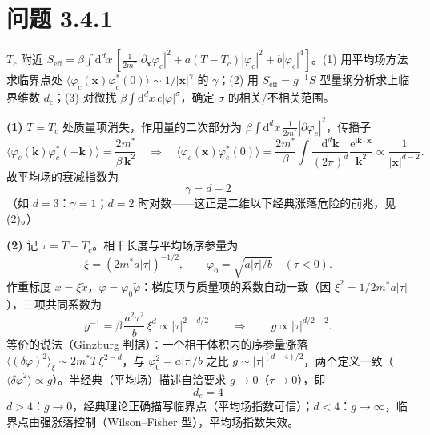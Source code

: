 \section*{问题 3.4.1}
\begin{problem}
$T_c$ 附近 $S_{\mathrm{eff}}=\beta\int\mathrm{d}^dx\,[\frac{1}{2m^{*}}|\partial_{\pmb{x}}\varphi_c|^{2}+a(T-T_c)|\varphi_c|^{2}+b|\varphi_c|^{4}]$。(1) 用平均场方法求临界点处 $\langle\varphi_c(\pmb{x})\varphi_c^{*}(0)\rangle\sim1/|\pmb{x}|^{\gamma}$ 的 $\gamma$；(2) 用 $S_{\mathrm{eff}}=g^{-1}\tilde S$ 型量纲分析求上临界维数 $d_c$；(3) 对微扰 $\beta\int\mathrm{d}^dx\,c|\varphi|^{\sigma}$，确定 $\sigma$ 的相关/不相关范围。
\end{problem}
\solution

\textbf{(1)} $T=T_c$ 处质量项消失，作用量的二次部分为 $\beta\int\mathrm{d}^dx\,\frac{1}{2m^{*}}|\partial\varphi_c|^{2}$，传播子
\begin{equation*}
\langle\varphi_c(\pmb{k})\varphi_c^{*}(-\pmb{k})\rangle=\frac{2m^{*}}{\beta\,\pmb{k}^{2}}
\quad\Longrightarrow\quad
\langle\varphi_c(\pmb{x})\varphi_c^{*}(0)\rangle
=\frac{2m^{*}}{\beta}\int\frac{\mathrm{d}^d\pmb{k}}{(2\pi)^{d}}\frac{\mathrm{e}^{\mathrm{i}\pmb{k}\cdot\pmb{x}}}{\pmb{k}^{2}}
\propto\frac{1}{|\pmb{x}|^{d-2}} .
\end{equation*}
故平均场的衰减指数为
\begin{equation*}
\boxed{\;\gamma=d-2\;}
\end{equation*}
（如 $d=3$：$\gamma=1$；$d=2$ 时对数——这正是二维以下经典涨落危险的前兆，见 (2)。）

\textbf{(2)} 记 $\tau=T-T_c$。相干长度与平均场序参量为
\begin{equation*}
\xi=(2m^{*}a|\tau|)^{-1/2},\qquad
\varphi_0=\sqrt{a|\tau|/b}\quad(\tau<0) .
\end{equation*}
作重标度 $x=\xi\tilde x$，$\varphi=\varphi_0\tilde\varphi$：梯度项与质量项的系数自动一致（因 $\xi^{2}=1/2m^{*}a|\tau|$），三项共同系数为
\begin{equation*}
g^{-1}=\beta\,\frac{a^{2}\tau^{2}}{b}\,\xi^{d}
\propto|\tau|^{2-d/2}
\qquad\Longrightarrow\qquad
g\propto|\tau|^{d/2-2} .
\end{equation*}
等价的说法（Ginzburg 判据）：一个相干体积内的序参量涨落 $\langle(\delta\varphi)^{2}\rangle_{\xi}\sim2m^{*}T\,\xi^{2-d}$，与 $\varphi_0^{2}=a|\tau|/b$ 之比 $g\sim|\tau|^{(d-4)/2}$，两个定义一致（$\langle\delta\tilde\varphi^{2}\rangle\propto g$）。半经典（平均场）描述自洽要求 $g\to0$（$\tau\to0$），即
\begin{equation*}
\boxed{\;d_c=4\;}
\end{equation*}
$d>4$：$g\to0$，经典理论正确描写临界点（平均场指数可信）；$d<4$：$g\to\infty$，临界点由强涨落控制（Wilson--Fisher 型），平均场指数失效。

